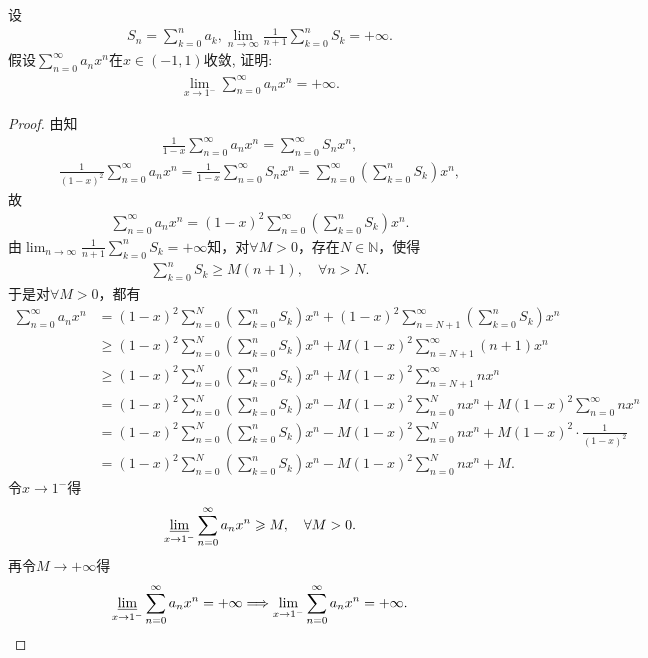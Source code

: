 \documentclass[../../main.tex]{subfiles}%
\begin{document}
\begin{example}
设
\begin{align*}
S_n = \sum_{k=0}^n a_k, \lim_{n \to \infty} \frac{1}{n+1} \sum_{k=0}^n S_k = +\infty.
\end{align*}
假设$\sum_{n=0}^\infty a_n x^n$在$x \in (-1,1)$收敛, 证明:
\begin{align*}
\lim_{x \to 1^-} \sum_{n=0}^\infty a_n x^n = +\infty.
\end{align*}
\end{example}
\begin{proof}
由知
\begin{align*}
\frac{1}{1-x}\sum_{n=0}^{\infty}a_nx^n = \sum_{n=0}^{\infty}S_nx^n,
\end{align*}
\begin{align*}
\frac{1}{(1-x)^2}\sum_{n=0}^{\infty}a_nx^n = \frac{1}{1-x}\sum_{n=0}^{\infty}S_nx^n = \sum_{n=0}^{\infty}\left( \sum_{k=0}^n S_k \right)x^n,
\end{align*}
故
\begin{align*}
\sum_{n=0}^{\infty}a_nx^n = (1-x)^2\sum_{n=0}^{\infty}\left( \sum_{k=0}^n S_k \right)x^n.
\end{align*}
由$\lim_{n \to \infty}\frac{1}{n+1}\sum_{k=0}^n S_k = +\infty$知，对$\forall M>0$，存在$N \in \mathbb{N}$，使得
\begin{align*}
\sum_{k=0}^n S_k \geqslant M(n+1), \quad \forall n>N.
\end{align*}
于是对$\forall M>0$，都有
\begin{align*}
\sum_{n=0}^{\infty}a_nx^n &= (1-x)^2\sum_{n=0}^N\left( \sum_{k=0}^n S_k \right)x^n + (1-x)^2\sum_{n=N+1}^{\infty}\left( \sum_{k=0}^n S_k \right)x^n \\
&\geqslant (1-x)^2\sum_{n=0}^N\left( \sum_{k=0}^n S_k \right)x^n + M(1-x)^2\sum_{n=N+1}^{\infty}(n+1)x^n \\
&\geqslant (1-x)^2\sum_{n=0}^N\left( \sum_{k=0}^n S_k \right)x^n + M(1-x)^2\sum_{n=N+1}^{\infty}nx^n \\
&= (1-x)^2\sum_{n=0}^N\left( \sum_{k=0}^n S_k \right)x^n - M(1-x)^2\sum_{n=0}^N nx^n + M(1-x)^2\sum_{n=0}^{\infty}nx^n \\
&= (1-x)^2\sum_{n=0}^N\left( \sum_{k=0}^n S_k \right)x^n - M(1-x)^2\sum_{n=0}^N nx^n + M(1-x)^2 \cdot \frac{1}{(1-x)^2} \\
&= (1-x)^2\sum_{n=0}^N\left( \sum_{k=0}^n S_k \right)x^n - M(1-x)^2\sum_{n=0}^N nx^n + M.
\end{align*}
令$x \to 1^-$得
\begin{align*}
\varliminf_{x \to 1^-}\sum_{n=0}^{\infty}a_nx^n \geqslant M,\quad \forall M>0.
\end{align*}
再令$M \to +\infty$得
\begin{align*}
\varliminf_{x \to 1^-}\sum_{n=0}^{\infty}a_nx^n = +\infty \Longrightarrow \lim_{x \to 1^-}\sum_{n=0}^{\infty}a_nx^n = +\infty.
\end{align*}
\end{proof}
\end{document}
